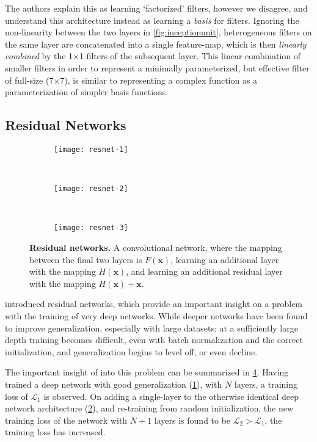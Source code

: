 \documentclass[thesis]{subfiles}
\begin{document}
The authors explain this as learning `factorized' filters, however we disagree, and understand this architecture instead as learning a \emph{basis} for filters. Ignoring the non-linearity between the two layers in \cref{fig:inceptionunit}, heterogeneous filters on the same layer are concatenated into a single feature-map, which is then \emph{linearly combined} by the 1$\times$1 filters of the subsequent layer. This linear combination of smaller filters in order to represent a minimally parameterized, but effective filter of full-size (7$\times$7), is similar to representing a complex function as a parameterization of simpler basis functions.

\subsection{Residual Networks}\label{residualnetworks}
\begin{figure}[tbp]
\begin{subfigure}[T]{0.32\textwidth}
\centering
\texttt{[image: resnet-1]}
\caption{}\label{fig:resnet-1}
\end{subfigure}
~
\begin{subfigure}[T]{0.32\textwidth}
\centering
\texttt{[image: resnet-2]}
\caption{}\label{fig:resnet-2}
\end{subfigure}
~
\begin{subfigure}[T]{0.32\textwidth}
\centering
\texttt{[image: resnet-3]}
\caption{}\label{fig:resnet-3}
\end{subfigure}
\caption[Residual networks]{\textbf{Residual networks.}  A convolutional network, where the mapping between the final two layers is $F(\mathbf{x})$,  learning an additional layer with the mapping $H(\mathbf{x})$, and  learning an additional residual layer with the mapping $H(\mathbf{x})+\mathbf{x}$.}
\label{fig:resnet}
\end{figure}
\citet{He2015} introduced residual networks, which provide an important insight on a problem with the training of very deep networks. While deeper networks have been found to improve generalization, especially with large datasets; at a sufficiently large depth training becomes difficult, even with batch normalization and the correct initialization, and generalization begins to level off, or even decline.

The important insight of \citet{He2015} into this problem can be summarized in \cref{fig:resnet}. Having trained a deep network with good generalization (\ie \cref{fig:resnet-1}), with $N$ layers, a training loss of $\mathcal{L}_1$ is observed. On adding a single-layer to the otherwise identical deep network architecture (\ie \cref{fig:resnet-2}), and re-training from random initialization, the new training loss of the network with $N+1$ layers is found to be $\mathcal{L}_2 > \mathcal{L}_1$, \ie the training loss has increased.
\end{document}
